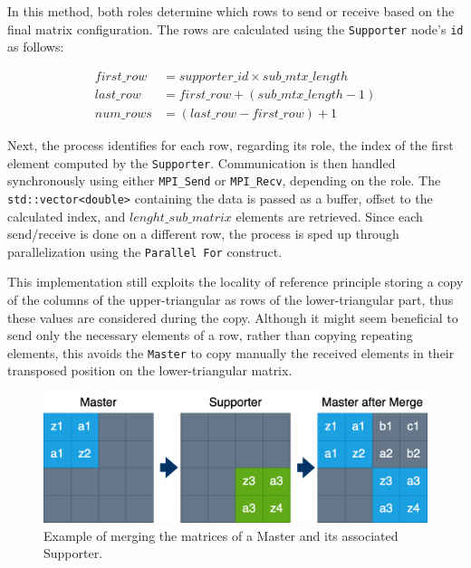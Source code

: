\par In this method, both roles determine which rows to send or receive based on the final matrix configuration. The rows are calculated using the \texttt{Supporter} node's \texttt{id} as follows:

\begin{align*}
    first\_row &= supporter\_id \times sub\_mtx\_length \\
    last\_row &= first\_row + (sub\_mtx\_length - 1) \\
    num\_rows &= (last\_row - first\_row) + 1
\end{align*}

Next, the process identifies for each row, regarding its role, the index of the first element computed by the \texttt{Supporter}. Communication is then handled synchronously using either \texttt{MPI\_Send} or \texttt{MPI\_Recv}, depending on the role. The \texttt{std::vector<double>} containing the data is passed as a buffer, offset to the calculated index, and $lenght\_sub\_matrix$ elements are retrieved. Since each send/receive is done on a different row, the process is sped up through parallelization using the \texttt{Parallel For} construct.

This implementation still exploits the locality of reference principle storing a copy of the columns of the upper-triangular as rows of the lower-triangular part, thus these values are considered during the copy. Although it might seem beneficial to send only the necessary elements of a row, rather than copying repeating elements, this avoids the \texttt{Master} to copy manually the received elements in their transposed position on the lower-triangular matrix. 

\begin{figure}[h]
    \centering\includegraphics[scale=0.25]{img/MPI/MergeMatrix.drawio.png}
    
    \caption{Example of merging the matrices of a Master and its associated Supporter.}
\end{figure}

